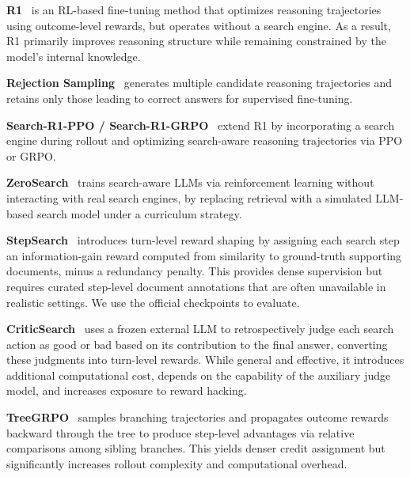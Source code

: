 \textbf{R1}~\cite{guo2025deepseek} is an RL-based fine-tuning method that optimizes reasoning trajectories using outcome-level rewards, but operates without a search engine. As a result, R1 primarily improves reasoning structure while remaining constrained by the model’s internal knowledge.

\textbf{Rejection Sampling}~\cite{ahn2024large} generates multiple candidate reasoning trajectories and retains only those leading to correct answers for supervised fine-tuning.

\textbf{Search-R1-PPO / Search-R1-GRPO}~\cite{jin2025search} extend R1 by incorporating a search engine during rollout and optimizing search-aware reasoning trajectories via PPO or GRPO.

\textbf{ZeroSearch}~\cite{sun2025zerosearch} trains search-aware LLMs via reinforcement learning without interacting with real search engines, by replacing retrieval with a simulated LLM-based search model under a curriculum strategy. 


\textbf{StepSearch}~\cite{zheng2025stepsearch} introduces turn-level reward shaping by assigning each search step an information-gain reward computed from similarity to ground-truth supporting documents, minus a redundancy penalty. This provides dense supervision but requires curated step-level document annotations that are often unavailable in realistic settings. We use the official checkpoints to evaluate.

\textbf{CriticSearch}~\cite{zhang2025criticsearch} uses a frozen external LLM to retrospectively judge each search action as good or bad based on its contribution to the final answer, converting these judgments into turn-level rewards. While general and effective, it introduces additional computational cost, depends on the capability of the auxiliary judge model, and increases exposure to reward hacking.

\textbf{TreeGRPO}~\cite{ji2025tree} samples branching trajectories and propagates outcome rewards backward through the tree to produce step-level advantages via relative comparisons among sibling branches. This yields denser credit assignment but significantly increases rollout complexity and computational overhead.


